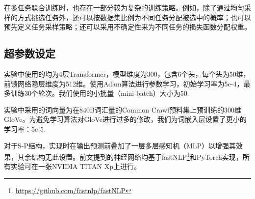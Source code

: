 在多任务联合训练时，也存在一部分较为复杂的训练策略。例如，除了通过均匀采样的方式挑选任务外，还可以按数据集比例为不同任务分配被选中的概率\cite{sanh2018hierarchical}；也可以预先定义任务采样策略\cite{DBLP:journals/tacl/KiperwasserB18}；还可以采用不确定性来为不同任务的损失函数分配权重\cite{DBLP:conf/cvpr/KendallGC18}。

\subsection{超参数设定}
实验中使用的均为4层Transformer，模型维度为300，包含6个头，每个头为50维，前馈网络隐层维度为512维。使用Adam算法\cite{kingma2015adam}进行参数学习，初始学习率为5e-4，最多训练30个轮次。我们使用的小批量（mini-batch）大小为50. 

实验中采用的词向量为在840B词汇量的Common Crawl预料集上预训练的300维GloVe\cite{DBLP:conf/emnlp/PenningtonSM14}。为避免学习算法对GloVe进行过多的修改，我们为词嵌入层设置了更小的学习率：5e-5.

对于S-P结构，实现时在输出预测前叠加了一层多层感知机（MLP）以增强其效果，其余结构无此设置。前文提到的神经网络均基于fastNLP\footnote{\url{https://github.com/fastnlp/fastNLP}}和PyTorch实现，所有实验可在一张NVIDIA TITAN Xp上进行。